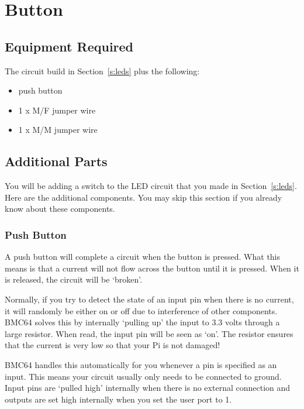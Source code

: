 \section{Button}\label{s:button}


\subsection*{Equipment Required}

The circuit build in Section~\ref{s:leds} plus the following:
\begin{itemize}
\item push button
\item 1 x M/F jumper wire
\item 1 x M/M jumper wire
\end{itemize}

\subsection*{Additional Parts}

You will be adding a switch to the LED circuit that you made in Section~\ref{s:leds}.  Here are the additional components.  You may skip this section if you already know about these components.

\subsubsection*{Push Button}


A push button will complete a circuit when the button is pressed.  What this means is that a current will not flow across the button until it is pressed.  When it is released, the circuit will be `broken'.

Normally, if you try to detect the state of an input pin when there is no current, it will randomly be either on or off due to interference of other components.  BMC64 solves this by internally `pulling up' the input to 3.3 volts through a large resistor.  When read, the input pin will be seen as `on'.  The resistor ensures that the current is very low so that your Pi is not damaged!

BMC64 handles this automatically for you whenever a pin is specified as an input.  This means your circuit usually only needs to be connected to ground.  Input pins are `pulled high' internally when there is no external connection and outputs are set high internally when you set the user port to 1.

